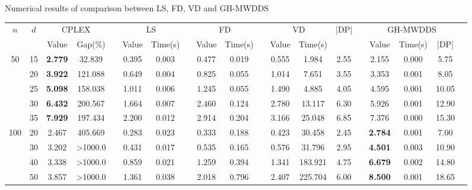 \documentclass[algorithms,article,accept,moreauthors,pdftex]{Definitions/mdpi}
\begin{document}
\begin{specialtable}
\widetable
\caption{Numerical results of comparison between LS, FD, VD and GH-MWDDS  \label{tab1:results}}
\begin{footnotesize}
\begin{tabular}{ccccccccccccccccccc} 
\toprule
$n$ & $d$  & \multicolumn{2}{c}{CPLEX} && \multicolumn{2}{c}{LS} && \multicolumn{2}{c}{FD} && \multicolumn{2}{c}{VD}& |DP|& &\multicolumn{3}{c}{GH-MWDDS}\\ 
\noalign{\smallskip}  \cline{3-4}  \cline{6-7} \cline{9-10} \cline{12-13} \cline{16-18}  \noalign{\smallskip}
  &    & Value & Gap(\%) && Value  &  Time(s)  &  &  Value  &  Time(s)  &  & Value  &  Time(s)&  &  & Value  &  Time(s)& |DP| \\ 
\midrule
 50  & 15   & \bf2.779   & 32.839  &&  0.395  &  0.003  & &  0.477  &  0.019   & &  0.555  &  1.984    & 2.55  & & 2.155  &  0.000 & 5.75 \\
     & 20   & \bf3.922   & 121.088 &&  0.649  &  0.004  & &  0.825  &  0.055   & &  1.014  &  7.651    & 3.55  & & 3.353  &  0.001 & 8.05 \\
     & 25   & \bf5.098   & 158.038 &&  1.011  &  0.006  & &  1.245  &  0.055   & &  1.490  &  4.885    & 4.05  & & 4.595  &  0.001 & 10.05 \\
     & 30   & \bf6.432   & 200.567 &&  1.664  &  0.007  & &  2.460  &  0.124   & &  2.780  &  13.117   & 6.30  & & 5.926  &  0.001 & 12.90 \\
     & 35   & \bf7.929   & 197.434 &&  2.200  &  0.012  & &  2.914  &  0.204   & &  3.166  &  25.048   & 6.85  & & 7.376  &  0.000 & 15.30 \\ \midrule 
 100 & 20   & 2.467   & 405.669 &&  0.283  &  0.023  & &  0.333  &  0.188   & &  0.423  &  30.458   & 2.45  & & {\bf 2.784}  &  0.001 & 7.00 \\
     & 30   & 3.202   & >1000.0 &&  0.431  &  0.017  & &  0.535  &  0.165   & &  0.576  &  31.796   & 2.95  & & {\bf 4.501}  &  0.003 & 10.90 \\
     & 40   & 3.338   & >1000.0 &&  0.859  &  0.021  & &  1.259  &  0.394   & &  1.341  &  183.921  & 4.75  & & {\bf 6.679}  &  0.002 & 14.80 \\
     & 50   & 3.857   & >1000.0 &&  1.361  &  0.038  & &  2.018  &  0.796   & &  2.407  &  225.704  & 6.00  & & {\bf 8.500}  &  0.001 & 18.65 \\

\end{tabular}
\end{footnotesize}
\end{specialtable}
\end{document}
